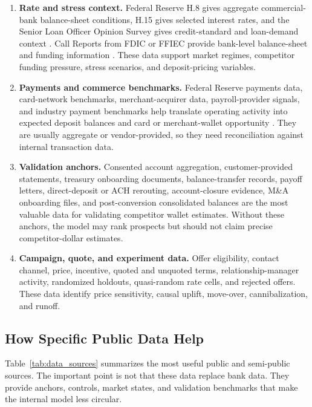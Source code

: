 \documentclass[11pt]{article}
\begin{document}
\begin{enumerate}[leftmargin=*]
  \item \textbf{Rate and stress context.} Federal Reserve H.8 gives aggregate
  commercial-bank balance-sheet conditions, H.15 gives selected interest rates,
  and the Senior Loan Officer Opinion Survey gives credit-standard and
  loan-demand context
  \citep{fed2026h8,fed2026h15,fed2026sloos}. Call Reports from FDIC or FFIEC
  provide bank-level balance-sheet and funding information
  \citep{fdic2026callreports,ffiec2026cdr}. These data support market regimes,
  competitor funding pressure, stress scenarios, and deposit-pricing variables.
  \item \textbf{Payments and commerce benchmarks.} Federal Reserve payments
  data, card-network benchmarks, merchant-acquirer data, payroll-provider
  signals, and industry payment benchmarks help translate operating activity
  into expected deposit balances and card or merchant-wallet opportunity
  \citep{fed2026frps}. They are usually aggregate or vendor-provided, so they
  need reconciliation against internal transaction data.
  \item \textbf{Validation anchors.} Consented account aggregation,
  customer-provided statements, treasury onboarding documents, balance-transfer
  records, payoff letters, direct-deposit or ACH rerouting, account-closure
  evidence, M\&A onboarding files, and post-conversion consolidated balances are
  the most valuable data for validating competitor wallet estimates. Without
  these anchors, the model may rank prospects but should not claim precise
  competitor-dollar estimates.
  \item \textbf{Campaign, quote, and experiment data.} Offer eligibility,
  contact channel, price, incentive, quoted and unquoted terms,
  relationship-manager activity, randomized holdouts, quasi-random rate cells,
  and rejected offers. These data identify price sensitivity, causal uplift,
  move-over, cannibalization, and runoff.
\end{enumerate}

\subsection{How Specific Public Data Help}

Table~\ref{tab:data_sources} summarizes the most useful public and semi-public
sources. The important point is not that these data replace bank data. They
provide anchors, controls, market states, and validation benchmarks that make
the internal model less circular.
\end{document}
